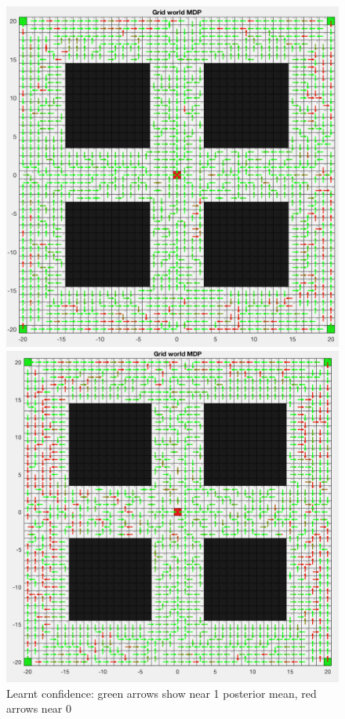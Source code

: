 \documentclass[a4paper]{report}
\begin{document}
{{{{				 \begin{figure}[ht!]
					\begin{minipage}{0.5\linewidth}
						\begin{center}
							\includegraphics[width=0.95\linewidth]{heatmap_confidence_120}
							\caption{Learnt confidence: green arrows show near 1 posterior mean, red arrows near 0}
							\label{fig::heatmap_confidence_120}
						\end{center}
					\end{minipage}
					\begin{minipage}{0.5\linewidth}
						\begin{center}
							\includegraphics[width=0.95\linewidth]{heatmap_confidence_50}

\end{center}
\end{minipage}
\end{figure}}}}}
\end{document}
